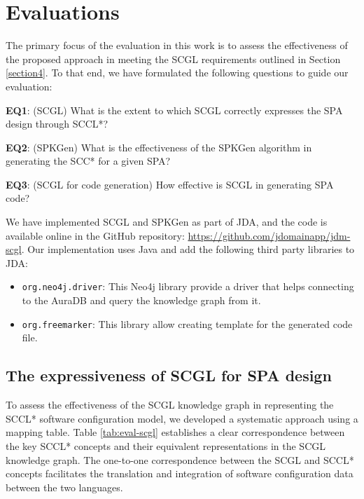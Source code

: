 \documentclass[runningheads]{llncs}
\begin{document}
\section{Evaluations} \label{section5}
The primary focus of the evaluation in this work is to assess the effectiveness of the proposed approach in meeting the SCGL requirements outlined in Section \ref{section4}. To that end, we have formulated the following  questions to guide our evaluation:

\textbf{EQ1}: (SCGL) What is the extent to which SCGL correctly expresses the SPA design through SCCL*?

\textbf{EQ2}: (SPKGen) What is the effectiveness of the SPKGen algorithm in generating the SCC* for a given SPA?

\textbf{EQ3}: (SCGL for code generation) How effective is SCGL in generating SPA code?


We have implemented SCGL and SPKGen as part of JDA, and the code is available online in the GitHub repository: \url{https://github.com/jdomainapp/jdm-scgl}. Our implementation uses Java and add the following third party libraries to JDA:
\begin{itemize}
    \item {\tt org.neo4j.driver}: This Neo4j library provide a driver that helps connecting to the AuraDB and query the knowledge graph from it.
    \item {\tt org.freemarker}: This library allow creating template for the generated code file.
\end{itemize}

\subsection{The expressiveness of SCGL for SPA design}
To assess the effectiveness of the SCGL knowledge graph in representing the SCCL* software configuration model, we developed a systematic approach using a mapping table. Table \ref{tab:eval-scgl} establishes a clear correspondence between the key SCCL* concepts and their equivalent representations in the SCGL knowledge graph. The one-to-one correspondence between the SCGL and SCCL* concepts facilitates the translation and integration of software configuration data between the two languages.
\end{document}
